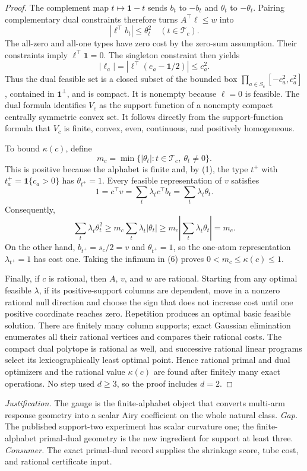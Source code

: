 \documentclass{article}
\begin{document}
\begin{proof}
The complement map \(t\mapsto\mathbf 1-t\) sends \(b_t\) to \(-b_t\) and \(\theta_t\) to \(-\theta_t\).  Pairing complementary dual constraints therefore turns \(A^\top\ell\le w\) into
\[
|\ell^\top b_t|\le\theta_t^2
\quad(t\in\mathcal T_c).
\tag{4}
\]
The all-zero and all-one types have zero cost by the zero-sum assumption.  Their constraints imply \(\ell^\top\mathbf 1=0\).  The singleton constraint then yields
\[
|\ell_a|=|\ell^\top(e_a-\mathbf 1/2)|\le c_a^2.
\tag{5}
\]
Thus the dual feasible set is a closed subset of the bounded box \(\prod_{a\in S_c}[-c_a^2,c_a^2]\), contained in \(\mathbf1^\perp\), and is compact.  It is nonempty because \(\ell=0\) is feasible.  The dual formula identifies \(V_c\) as the support function of a nonempty compact centrally symmetric convex set.  It follows directly from the support-function formula that \(V_c\) is finite, convex, even, continuous, and positively homogeneous.

To bound \(\kappa(c)\), define
\[
m_c=\min\{|\theta_t|:t\in\mathcal T_c,\ \theta_t\ne0\}.
\]
This is positive because the alphabet is finite and, by (1), the type \(t^+\) with \(t_a^+=\mathbf1\{c_a>0\}\) has \(\theta_{t^+}=1\).  Every feasible representation of \(v\) satisfies
\[
1=c^\top v=\sum_t\lambda_tc^\top b_t=\sum_t\lambda_t\theta_t.
\]
Consequently,
\[
\sum_t\lambda_t\theta_t^2
\ge m_c\sum_t\lambda_t|\theta_t|
\ge m_c\left|\sum_t\lambda_t\theta_t\right|=m_c.
\tag{6}
\]
On the other hand, \(b_{t^+}=s_c/2=v\) and \(\theta_{t^+}=1\), so the one-atom representation \(\lambda_{t^+}=1\) has cost one.  Taking the infimum in (6) proves \(0<m_c\le\kappa(c)\le1\).

Finally, if \(c\) is rational, then \(A\), \(v\), and \(w\) are rational.  Starting from any optimal feasible \(\lambda\), if its positive-support columns are dependent, move in a nonzero rational null direction and choose the sign that does not increase cost until one positive coordinate reaches zero.  Repetition produces an optimal basic feasible solution.  There are finitely many column supports; exact Gaussian elimination enumerates all their rational vertices and compares their rational costs.  The compact dual polytope is rational as well, and successive rational linear programs select its lexicographically least optimal point.  Hence rational primal and dual optimizers and the rational value \(\kappa(c)\) are found after finitely many exact operations.  No step used \(d\ge3\), so the proof includes \(d=2\).
\end{proof}
\par\smallskip\noindent \textit{Justification.} The gauge is the finite-alphabet object that converts multi-arm response geometry into a scalar Airy coefficient on the whole natural class. \textit{Gap.} The published support-two experiment has scalar curvature one; the finite-alphabet primal-dual geometry is the new ingredient for support at least three. \textit{Consumer.} The exact primal-dual record supplies the shrinkage score, tube cost, and rational certificate input.
\end{document}
